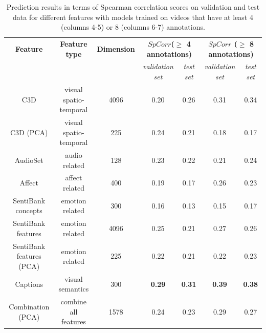 \documentclass[sigconf]{acmart}
\begin{document}
\begin{table}
	\centering
	\renewcommand{\arraystretch}{1.2}
	\begin{tabular}{|c|c|c|c|c|c|c|}
		\hline
		\textbf{Feature} & \textbf{Feature type}& \textbf{Dimension}& \multicolumn{2}{c|}{\textbf{$SpCorr$($\geq$ 4 annotations)}} & \multicolumn{2}{c|}{\textbf{$SpCorr$ ($\geq$ 8 annotations)}}\\
		\cline{4-7}
		& & & \emph{validation set}& \emph{test set} & \emph{validation set}& \emph{test set}\\ \hline
		C3D& visual spatio-temporal& 4096& 0.20& 0.26& 0.31& 0.34\\ \hline
		C3D (PCA)& visual spatio-temporal & 225& 0.24& 0.21& 0.18& 0.17\\ \hline
		AudioSet& audio related& 128& 0.23& 0.22& 0.21& 0.24\\ \hline
		Affect& affect related& 400& 0.19& 0.17& 0.26& 0.23\\ \hline
		SentiBank concepts& emotion related& 300& 0.16& 0.13& 0.15& 0.17\\ \hline
		SentiBank features& emotion related& 4096& 0.25& 0.21& 0.27& 0.26\\ \hline
		SentiBank features (PCA)& emotion related & 225& 0.22& 0.21& 0.22& 0.23\\ \hline
		Captions& visual semantics & 300& \textbf{0.29}& \textbf{0.31}& \textbf{0.39}& \textbf{0.38} \\ \hline
		Combination (PCA)& combine all features & 1578& 0.24& 0.23& 0.29& 0.27\\ \hline		
	\end{tabular}
	\caption{Prediction results in terms of Spearman correlation scores on validation and test data for different features with models trained on videos that have at least 4 (columns 4-5) or 8 (columns 6-7) annotations.}
	\label{res-4-10-ann}	
\end{table}
\end{document}
